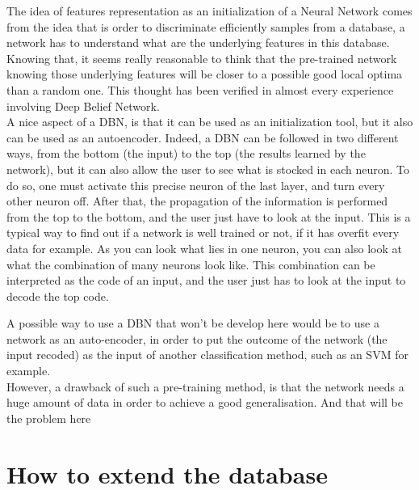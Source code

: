 \documentclass{report}
\begin{document}
		The idea of features representation as an initialization of a Neural Network comes from the idea that is order to discriminate efficiently samples from a database, a network has to understand what are the underlying features in this database. Knowing that, it seems really reasonable to think that the pre-trained network knowing those underlying features will be closer to a possible good local optima than a random one. This thought has been verified in almost every experience involving Deep Belief Network.\\
		
		A nice aspect of a DBN, is that it can be used as an initialization tool, but it also can be used as an autoencoder. Indeed, a DBN can be followed in two different ways, from the bottom (the input) to the top (the results learned by the network), but it can also allow the user to see what is stocked in each neuron. To do so, one must activate this precise neuron of the last layer, and turn every other neuron off. After that, the propagation of the information is performed from the top to the bottom, and the user just have to look at the input. This is a typical way to find out if a network is well trained or not, if it has overfit every data for example. As you can look what lies in one neuron, you can also look at what the combination of many neurons look like. This combination can be interpreted as the code of an input, and the user just has to look at the input to decode the top code.
		
		
		A possible way to use a DBN that won't be develop here would be to use a network as an auto-encoder, in order to put the outcome of the network (the input recoded) as the input of another classification method, such as an SVM for example.\\
		
		However, a drawback of such a pre-training method, is that the network needs a huge amount of data in order to achieve a good generalisation. And that will be the problem here
		
		\section{How to extend the database}
		
\end{document}
